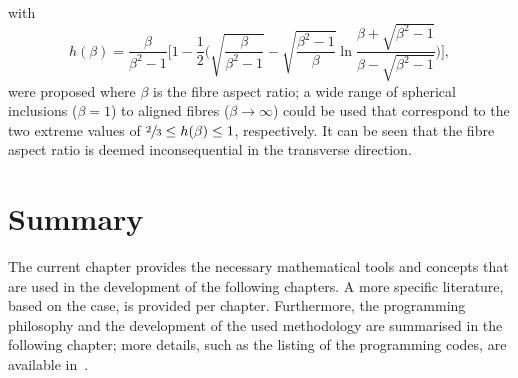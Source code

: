 	with
	\begin{equation}
	h(\beta)=\frac{\beta}{\beta^2-1}\Big[1-\frac{1}{2}\Big(\sqrt{\frac{\beta}{\beta^2-1}}-\sqrt{\frac{\beta^2-1}{\beta}}\ln\frac{\beta+\sqrt{\beta^2-1}}{\beta-\sqrt{\beta^2-1}}\Big)\Big],
	\end{equation}
	were proposed where $\beta$ is the fibre aspect ratio; a wide range of spherical inclusions ($\beta=1$) to aligned fibres ($\beta\rightarrow\infty$) could be used that correspond to the two extreme values of $\sfrac{2}{3}\le h(\beta)\le1$, respectively. It can be seen that the fibre aspect ratio is deemed inconsequential in the transverse direction.






\section{Summary}
	The current chapter provides the necessary mathematical tools and concepts that are used in the development of the following chapters. A more specific literature, based on the case, is provided per chapter. Furthermore, the programming philosophy and the development of the used methodology are summarised in the following chapter; more details, such as the listing of the programming codes, are available in~\parencite{Javanbakht.2017}. 

\bl

	




